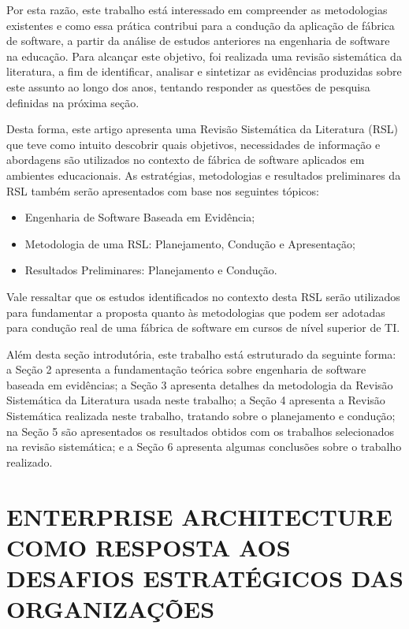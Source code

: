 Por esta razão, este trabalho está interessado em compreender as metodologias existentes e como essa prática contribui para a condução da aplicação de fábrica de software, a partir da análise de estudos anteriores na engenharia de software na educação. Para alcançar este objetivo, foi realizada uma revisão sistemática da literatura, a fim de identificar, analisar e sintetizar as evidências produzidas sobre este assunto ao longo dos anos, tentando responder as questões de pesquisa definidas na próxima seção.

Desta forma, este artigo apresenta uma Revisão Sistemática da Literatura (RSL) que teve como intuito descobrir quais objetivos, necessidades de informação e abordagens são utilizados no contexto de fábrica de software aplicados em ambientes educacionais. As estratégias, metodologias e resultados preliminares da RSL também serão apresentados com base nos seguintes tópicos:

\begin{itemize}
    \item Engenharia de Software Baseada em Evidência;
    \item Metodologia de uma RSL: Planejamento, Condução e Apresentação;
    \item Resultados Preliminares: Planejamento e Condução.
\end{itemize}

Vale ressaltar que os estudos identificados no contexto desta RSL serão utilizados para fundamentar a proposta quanto às metodologias que podem ser adotadas para condução real de uma fábrica de software em cursos de nível superior de TI.

Além desta seção introdutória, este trabalho está estruturado da seguinte forma: a Seção 2 apresenta a fundamentação teórica sobre engenharia de software baseada em evidências; a Seção 3 apresenta detalhes da metodologia da Revisão Sistemática da Literatura usada neste trabalho; a Seção 4 apresenta a Revisão Sistemática realizada neste trabalho, tratando sobre o planejamento e condução; na Seção 5 são apresentados os resultados obtidos com os trabalhos selecionados na revisão sistemática; e a Seção 6 apresenta algumas conclusões sobre o trabalho realizado.



\section{ENTERPRISE ARCHITECTURE COMO RESPOSTA AOS DESAFIOS ESTRATÉGICOS DAS ORGANIZAÇÕES}
\label{sec:trabalhosRelacionados}

